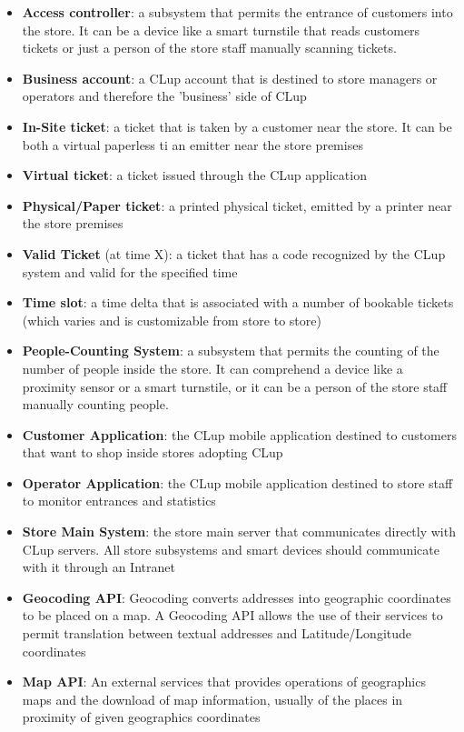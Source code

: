 \begin{itemize}
    \item \textbf{Access controller}: a subsystem that permits the entrance of customers into the store. It can be a device like a smart turnstile that reads customers tickets or just a person of the store staff manually scanning tickets.
    \item \textbf{Business account}: a CLup account that is destined to store managers or operators and therefore the 'business' side of CLup
    \item \textbf{In-Site ticket}: a ticket that is taken by a customer near the store. It can be both a virtual paperless ti an emitter near the store premises
    \item \textbf{Virtual ticket}: a ticket issued through the CLup application
    \item \textbf{Physical/Paper ticket}: a printed physical ticket, emitted by a printer near the store premises
    \item \textbf{Valid Ticket} (at time X): a ticket that has a code recognized by the CLup system and valid for the specified time
    \item \textbf{Time slot}: a time delta that is associated with a number of bookable tickets (which varies and is customizable from store to store)
    \item \textbf{People-Counting System}: a subsystem that permits the counting of the number of people inside the store. It can comprehend a device like a proximity sensor or a smart turnstile, or it can be a person of the store staff manually counting people.
    \item \textbf{Customer Application}: the CLup mobile application destined to customers that want to shop inside stores adopting CLup
    \item \textbf{Operator Application}: the CLup mobile application destined to store staff to monitor entrances and statistics
    \item \textbf{Store Main System}: the store main server that communicates directly with CLup servers. All store subsystems and smart devices should communicate with it through an Intranet
    \item \textbf{Geocoding API}: Geocoding converts addresses into geographic coordinates to be placed on a map. A Geocoding API allows the use of their services to permit translation between textual addresses and Latitude/Longitude coordinates
    \item \textbf{Map API}: An external services that provides operations of geographics maps and the download of map information, usually of the places in proximity of given geographics coordinates

\end{itemize}
